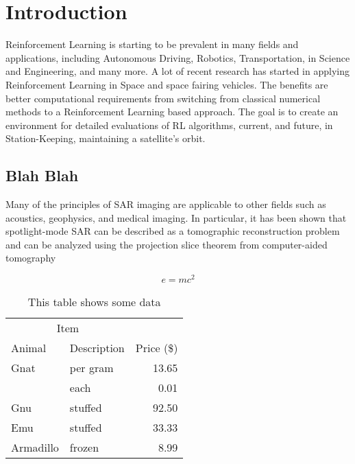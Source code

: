 \chapter{Introduction}\label{ch:intro}

Reinforcement Learning is starting to be prevalent in many fields and applications, including Autonomous Driving, Robotics, Transportation, in Science and Engineering, and many more. A lot of recent research has started in applying Reinforcement Learning in Space and space fairing vehicles. The benefits are better computational requirements from switching from classical numerical methods to a Reinforcement Learning based approach. The goal is to create an environment for detailed evaluations of RL algorithms, current, and future, in Station-Keeping, maintaining a satellite's orbit.

\section{Blah Blah}


Many of the principles of SAR imaging are applicable to other fields such as
acoustics, geophysics, and medical imaging. In particular, it has been shown
that spotlight-mode SAR can be described as a tomographic reconstruction problem
and can be analyzed using the projection slice theorem from computer-aided
tomography\cite{Garza:2011fk}

\begin{equation}\label{eq:einstein}
	e = mc^{2}
\end{equation}



\begin{table}[p]
  \centering
\begin{tabular}{llr}
\toprule
\multicolumn{2}{c}{Item} \\
\cmidrule(r){1-2}
Animal    & Description & Price (\$) \\
\midrule
Gnat      & per gram    & 13.65      \\
          & each        & 0.01       \\
Gnu       & stuffed     & 92.50      \\
Emu       & stuffed     & 33.33      \\
Armadillo & frozen      & 8.99       \\
\bottomrule
\end{tabular}
  \caption[Table Example]{This table shows some data}
  \label{tab:myfirsttable}
\end{table}
